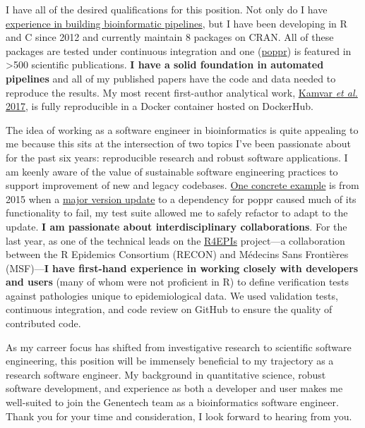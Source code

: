\vspace{1ex}

I have all of the desired qualifications for this position. Not only do I have
\href{https://github.com/zkamvar/read-processing}{experience in building
bioinformatic pipelines}, but I have been developing in R and C since 2012
and currently maintain 8 packages on CRAN. All of these packages are tested
under continuous integration and one
(\href{https://grunwaldlab.github.io/poppr}{poppr}) is featured in
\textgreater500 scientific publications. \textbf{I have a solid foundation in automated
pipelines} and all of my published papers have the code and data needed to
reproduce the results.  My most recent first-author analytical work,
\href{https://peerj.com/articles/4152/}{Kamvar \textit{et al.} 2017}, is fully
reproducible in a Docker container hosted on DockerHub.

\vspace{1ex}

The idea of working as a software engineer in bioinformatics is quite appealing to me
because this sits at the intersection of two topics I've been passionate about
for the past six years: reproducible research and robust software applications.
I am keenly aware of the value of sustainable software engineering practices to support improvement of new and
legacy codebases. \href{https://github.com/grunwaldlab/poppr/issues/16}{One
concrete example} is from 2015 when a
\href{https://github.com/thibautjombart/adegenet/commit/add256cd11f37e4865e4278e6bf3ffa81bcd0f63}{major
version update} to a dependency for poppr caused much of its functionality to
fail, my test suite allowed me to safely refactor to adapt to the update. \textbf{I am passionate about interdisciplinary collaborations}. For
the last year, as one of the technical leads on the
\href{https://r4epis.netlify.com}{R4EPIs} project---a collaboration between the
R Epidemics Consortium (RECON) and M\'{e}decins Sans Fronti\`{e}res (MSF)---\textbf{I
have first-hand experience in working closely with developers and users} (many
of whom were not proficient in R) to define verification tests against
pathologies unique to epidemiological data. We used validation tests,
continuous integration, and code review on GitHub to ensure the quality of
contributed code.

\vspace{1ex}

As my carreer focus has shifted from investigative research to scientific
software engineering, this position will be immensely beneficial to my
trajectory as a research software engineer. My background in quantitative
science, robust software development, and experience as both a developer and 
user makes me well-suited to join the Genentech team as a bioinformatics software engineer. Thank you for your time and consideration, I look forward to
hearing from you. 

